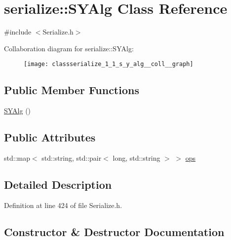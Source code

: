 \hypertarget{classserialize_1_1_s_y_alg}{}\section{serialize\+:\+:S\+Y\+Alg Class Reference}
\label{classserialize_1_1_s_y_alg}


{\ttfamily \#include $<$Serialize.\+h$>$}



Collaboration diagram for serialize\+:\+:S\+Y\+Alg\+:\nopagebreak
\begin{figure}[H]
\begin{center}
\leavevmode
\texttt{[image: classserialize\_1\_1\_s\_y\_alg\_\_coll\_\_graph]}
\end{center}
\end{figure}
\subsection*{Public Member Functions}
\begin{DoxyCompactItemize}
\item 
\hyperlink{classserialize_1_1_s_y_alg_a0e57b976c122fc29293c26e3e4c3ae55}{S\+Y\+Alg} ()
\end{DoxyCompactItemize}
\subsection*{Public Attributes}
\begin{DoxyCompactItemize}
\item 
std\+::map$<$ std\+::string, std\+::pair$<$ long, std\+::string $>$ $>$ \hyperlink{classserialize_1_1_s_y_alg_a1e3689b2ee1e8e0f088407e854fca3ab}{ops}
\end{DoxyCompactItemize}


\subsection{Detailed Description}


Definition at line 424 of file Serialize.\+h.



\subsection{Constructor \& Destructor Documentation}
\hypertarget{classserialize_1_1_s_y_alg_a0e57b976c122fc29293c26e3e4c3ae55}{}
